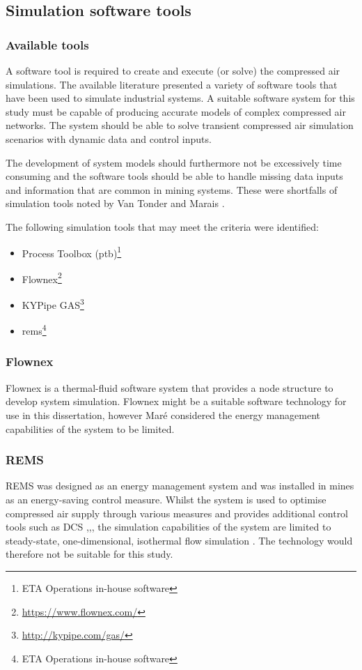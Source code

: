 \subsection{Simulation software tools}
\subsubsection{Available tools}
A software tool is required to create and execute (or solve) the compressed air simulations. The available literature presented a variety of software tools that have been used to simulate industrial systems. A suitable software system for this study must be capable of producing accurate models of complex compressed air networks. The system should be able to solve transient compressed air simulation scenarios with dynamic data and control inputs.
\clearpage
\par 
The development of system models should furthermore not be excessively time consuming and the software tools should be able to handle missing data inputs and information that are common in mining systems. These were shortfalls of simulation tools noted by Van Tonder \cite{vanTonder2014PhD} and Marais \cite{Mare2016PhD}.
\par
The following simulation tools that may meet the criteria were identified: 
\begin{itemize}
	\item Process Toolbox (\gls{ptb})\footnote{ETA Operations in-house software}
	\item Flownex\footnote{\url{https://www.flownex.com/}}
	\item KYPipe GAS\footnote{\url{http://kypipe.com/gas/}}
	\item \gls{rems}\footnote{ETA Operations in-house software}
\end{itemize} 
\subsubsection{Flownex}
Flownex is a thermal-fluid software system that provides a node structure to develop system simulation. Flownex might be a suitable software technology for use in this dissertation, however Maré \cite{Mare2016PhD} considered the energy management capabilities of the system to be limited. 
\par
\subsubsection{REMS}
REMS was designed as an energy management system and was installed in mines as an energy-saving control measure. Whilst the system is used to optimise compressed air supply through various measures and provides additional control tools such as DCS \cite{vanTonder2014PhD},\cite{van2014developing},\cite{van2015implementation}, the simulation capabilities of the system are limited to steady-state, one-dimensional, isothermal flow simulation \cite{vanNiekerk2012Value}. The technology would therefore not be suitable for this study.
\par
